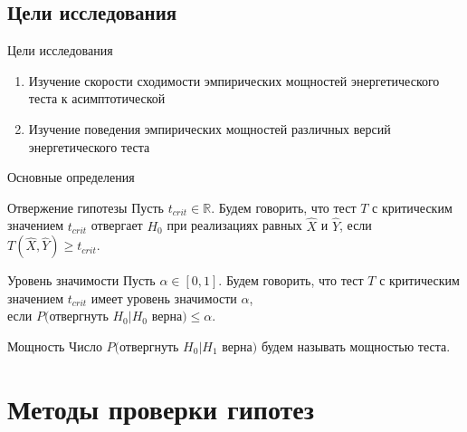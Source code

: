 \documentclass[12pt]{beamer}
\begin{document}
\subsection{Цели исследования}
\begin{frame}{Цели исследования}
    \begin{enumerate}
        \item Изучение скорости сходимости эмпирических мощностей энергетического теста к асимптотической
    	\pause
    	\vspace{0.1in}
    	\item Изучение поведения эмпирических мощностей различных версий энергетического теста
    \end{enumerate}
\end{frame}


\begin{frame}{Основные определения}
	
	\begin{block}{Отвержение гипотезы}
		Пусть $t_{crit} \in \mathbb{R}$. Будем говорить, что тест $T$ с критическим значением $t_{crit}$ отвергает $H_0$ при реализациях равных $\hat{X}$ и $\hat{Y}$, если $T(\hat{X},\hat{Y}) \geqslant t_{crit}$.
	\end{block}
	
	\pause
	
	\begin{block}{Уровень значимости}
		Пусть $\alpha \in [0,1]$. Будем говорить, что тест $T$ с критическим значением $t_{crit}$ имеет уровень значимости $\alpha$,\\ если $P($отвергнуть $H_0 | H_0$ верна$) \leqslant \alpha$.
	\end{block}
	
	\pause
	
	\begin{block}{Мощность}
		Число $P($отвергнуть $H_0 | H_1$ верна$)$ будем называть мощностью теста.
	\end{block}


\end{frame}


\section{Методы проверки гипотез}
\end{document}
